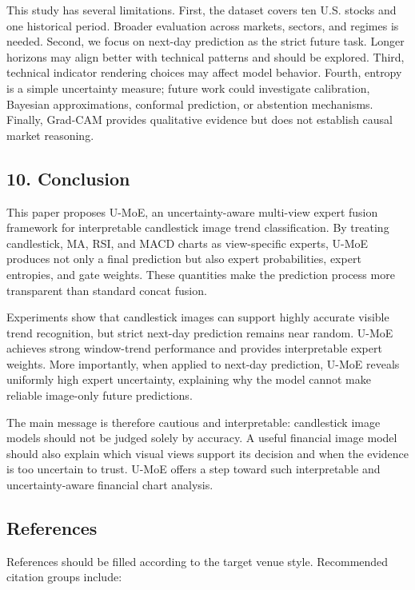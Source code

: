 \documentclass[
]{article}
\begin{document}
This study has several limitations. First, the dataset covers ten U.S.
stocks and one historical period. Broader evaluation across markets,
sectors, and regimes is needed. Second, we focus on next-day prediction
as the strict future task. Longer horizons may align better with
technical patterns and should be explored. Third, technical indicator
rendering choices may affect model behavior. Fourth, entropy is a simple
uncertainty measure; future work could investigate calibration, Bayesian
approximations, conformal prediction, or abstention mechanisms. Finally,
Grad-CAM provides qualitative evidence but does not establish causal
market reasoning.

\subsection{10. Conclusion}\label{conclusion}

This paper proposes U-MoE, an uncertainty-aware multi-view expert fusion
framework for interpretable candlestick image trend classification. By
treating candlestick, MA, RSI, and MACD charts as view-specific experts,
U-MoE produces not only a final prediction but also expert
probabilities, expert entropies, and gate weights. These quantities make
the prediction process more transparent than standard concat fusion.

Experiments show that candlestick images can support highly accurate
visible trend recognition, but strict next-day prediction remains near
random. U-MoE achieves strong window-trend performance and provides
interpretable expert weights. More importantly, when applied to next-day
prediction, U-MoE reveals uniformly high expert uncertainty, explaining
why the model cannot make reliable image-only future predictions.

The main message is therefore cautious and interpretable: candlestick
image models should not be judged solely by accuracy. A useful financial
image model should also explain which visual views support its decision
and when the evidence is too uncertain to trust. U-MoE offers a step
toward such interpretable and uncertainty-aware financial chart
analysis.

\subsection{References}\label{references}

References should be filled according to the target venue style.
Recommended citation groups include:
\end{document}
